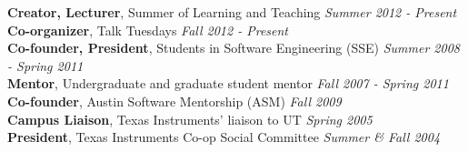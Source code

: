 \documentclass[9pt]{article}
\newenvironment{changemargin}[2]{%
  \begin{list}{}{%
    \setlength{\topsep}{0pt}%
    \setlength{\leftmargin}{#1}%
    \setlength{\rightmargin}{#2}%
    \setlength{\listparindent}{\parindent}%
    \setlength{\itemindent}{\parindent}%
    \setlength{\parsep}{\parskip}%
  }%
  \item[]}{\end{list}
}
\newenvironment{body} {
	\vspace*{-16pt}
	\begin{changemargin}{-0.25in}{-0.5in}
  }	
	{\end{changemargin}
}
\begin{document}
\begin{body}
	\vspace{14pt}
	\textbf{Creator, Lecturer}, Summer of Learning and Teaching \hfill {} \emph{Summer 2012 - Present}\\
	\medskip
	\textbf{Co-organizer}, Talk Tuesdays \hfill {} \emph{Fall 2012 - Present}\\
	\medskip
	\textbf{Co-founder, President}, Students in Software Engineering (SSE) \hfill {} \emph{Summer 2008 - Spring 2011}\\
	\medskip
	\textbf{Mentor}, Undergraduate and graduate student mentor \hfill{} \emph{Fall 2007 - Spring 2011}\\
	\medskip
	\textbf{Co-founder}, Austin Software Mentorship (ASM) \hfill{} \emph{Fall 2009}\\
	\medskip
	\textbf{Campus Liaison}, Texas Instruments' liaison to UT \hfill{} \emph{Spring 2005}\\
	\medskip
	\textbf{President}, Texas Instruments Co-op Social Committee \hfill{} \emph{Summer \& Fall 2004}\\
\end{body}
\end{document}
